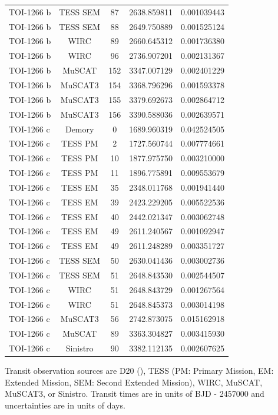 \documentclass[twocolumn]{aastex631}
\begin{document}
\begin{table}[htbp]
\begin{tabular}{lcccc}
TOI-1266 b & TESS SEM & 87 & 2638.859811 & 0.001039443 \\
TOI-1266 b & TESS SEM & 88 & 2649.750889 & 0.001525124 \\
TOI-1266 b & WIRC & 89 & 2660.645312 & 0.001736380 \\
TOI-1266 b & WIRC & 96 & 2736.907201 & 0.002131367 \\
TOI-1266 b & MuSCAT & 152 & 3347.007129 & 0.002401229 \\
TOI-1266 b & MuSCAT3 & 154 & 3368.796296 & 0.001593378 \\
TOI-1266 b & MuSCAT3 & 155 & 3379.692673 & 0.002864712 \\
TOI-1266 b & MuSCAT3 & 156 & 3390.588036 & 0.002639571 \\
\hline
TOI-1266 c & Demory & 0 & 1689.960319 & 0.042524505 \\
TOI-1266 c & TESS PM & 2 & 1727.560744 & 0.007774661 \\
TOI-1266 c & TESS PM & 10 & 1877.975750 & 0.003210000 \\
TOI-1266 c & TESS PM & 11 & 1896.775891 & 0.009553679 \\
TOI-1266 c & TESS EM & 35 & 2348.011768 & 0.001941440 \\
TOI-1266 c & TESS EM & 39 & 2423.229205 & 0.005522536 \\
TOI-1266 c & TESS EM & 40 & 2442.021347 & 0.003062748 \\
TOI-1266 c & TESS EM & 49 & 2611.240567 & 0.001092947 \\
TOI-1266 c & TESS EM & 49 & 2611.248289 & 0.003351727 \\
TOI-1266 c & TESS SEM & 50 & 2630.041436 & 0.003002736 \\
TOI-1266 c & TESS SEM & 51 & 2648.843530 & 0.002544507 \\
TOI-1266 c & WIRC & 51 & 2648.843729 & 0.001267564 \\
TOI-1266 c & WIRC & 51 & 2648.845373 & 0.003014198 \\
TOI-1266 c & MuSCAT3 & 56 & 2742.873075 & 0.015162918 \\
TOI-1266 c & MuSCAT & 89 & 3363.304827 & 0.003415930 \\
TOI-1266 c & Sinistro & 90 & 3382.112135 & 0.002607625 \\
\hline
\end{tabular}
\label{tab:Observed transits}
\vspace{0.5cm}
\footnotesize
\begin{flushleft}
Transit observation sources are D20 (\cite{Demory_2020}), TESS (PM: Primary Mission, EM: Extended Mission, SEM: Second Extended Mission), WIRC, MuSCAT, MuSCAT3, or Sinistro. Transit times are in units of BJD - 2457000 and uncertainties are in units of days.
\end{flushleft}
\end{table}
\end{document}
